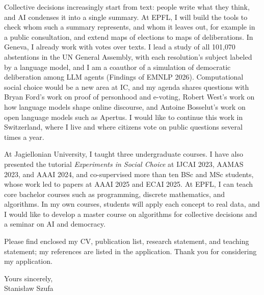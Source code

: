 \documentclass[11pt,a4paper]{article}
\begin{document}
Collective decisions increasingly start from text: people write what they
think, and AI condenses it into a single summary. At EPFL, I will build the
tools to check whom such a summary represents, and whom it leaves out, for
example in a public consultation, and extend maps of elections to maps of
deliberations. In Geneva, I already work with votes over texts. I lead a study of all
101{,}070 abstentions in the UN General Assembly, with each resolution's
subject labeled by a language model, and I am a coauthor of a
simulation of democratic deliberation among LLM agents (Findings of EMNLP
2026). Computational social choice would be a new area at IC, and my agenda
shares questions with Bryan Ford's work on proof of personhood and e-voting,
Robert West's work on how language models shape online discourse, and Antoine
Bosselut's work on open language models such as Apertus. I would like to
continue this work in Switzerland, where I live and where citizens vote on
public questions several times a year.

At Jagiellonian University, I taught three undergraduate courses. I have also
presented the tutorial
\emph{Experiments in Social Choice} at IJCAI 2023, AAMAS 2023, and AAAI 2024,
and co-supervised more than ten BSc and MSc students, whose work led to papers
at AAAI 2025 and ECAI 2025. At EPFL, I can teach core bachelor courses such as
programming, discrete mathematics, and algorithms. In my own courses, students
will apply each concept to real data, and I would like to develop
a master course on algorithms for collective decisions and a seminar on AI and
democracy.

Please find enclosed my CV, publication list, research statement, and teaching
statement; my references are listed in the application. Thank you for
considering my application.

Yours sincerely,\\[4pt]
Stanisław Szufa
\end{document}
